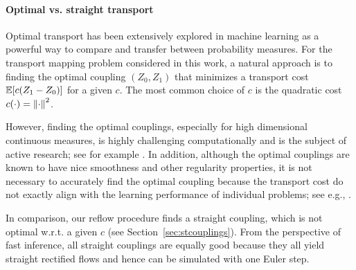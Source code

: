  



\paragraph{Optimal vs. straight transport}
Optimal transport has been extensively explored in machine learning 
as a powerful way to 
 compare and transfer between probability measures. 
 For the transport mapping problem considered in this work,
 a natural approach is to finding the optimal coupling $(Z_0,Z_1)$ that minimizes a transport cost $\mathbb{E}[c(Z_1-Z_0)]$ for a given $c$. 
 The most common choice of $c$ is the quadratic cost $c(\cdot) = \left\lVert\cdot\right\rVert^2$. 
 
 However, 
 finding the optimal couplings, 
 especially for high dimensional continuous measures, is highly challenging computationally and is the subject of active research; 
 see for example \citep{seguy2017large, korotin2021neural, korotin2022neural, makkuva2020optimal, rout2021generative, daniels2021score}.    
 In addition, 
although the optimal couplings 
are known to have nice smoothness and other regularity properties, 
it is not necessary to accurately find the optimal coupling because the transport cost
do not exactly align with
the learning  performance of individual problems; see e.g., \cite{korotin2021neural}.  %
 
 
 
 
 In comparison, 
 our reflow procedure 
 finds a straight coupling, 
 which is not optimal w.r.t. a given $c$ (see Section~\ref{sec:stcouplings}).  
 From the perspective of fast inference, 
 all straight couplings are equally good because they all yield straight rectified flows and hence can be simulated with one Euler step. 
 
 







 
 
